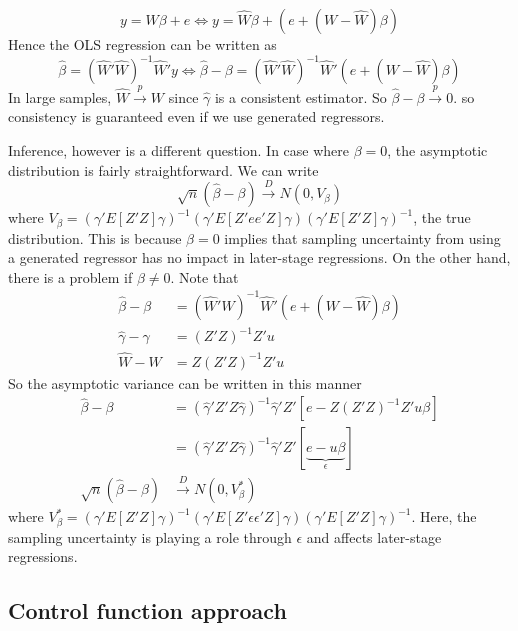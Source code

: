 \documentclass[12pt]{article}
\theoremstyle{definition}
\theoremstyle{property}
\theoremstyle{assumption}
\theoremstyle{example}
\theoremstyle{comment}
\begin{document}
\begin{itemize}
\[y=W\beta+e \iff y=\widehat{W}\beta + (e+(W-\widehat{W})\beta)
\]
Hence the OLS regression can be written as
\[
\hat{\beta} = (\widehat{W}'\widehat{W})^{-1}\widehat{W}'y \iff \hat{\beta}-\beta =  (\widehat{W}'\widehat{W})^{-1}\widehat{W}'(e+(W-\widehat{W})\beta)
\]
In large samples, $\widehat{W}\xrightarrow{p}W$ since $\hat{\gamma}$ is a consistent estimator. So $\hat{\beta}-\beta\xrightarrow{p}0$. so consistency is guaranteed even if we use generated regressors. 
\par
Inference, however is a different question. In case where $\beta=0$, the asymptotic distribution is fairly straightforward. We can write
\[
\sqrt{n}(\hat{\beta}-\beta)\xrightarrow{D}N(0,V_\beta)
\]
where $V_\beta=\left(\gamma'E[Z'Z]\gamma\right)^{-1}\left(\gamma'E[Z'ee'Z] \gamma\right) \left(\gamma'E[Z'Z]\gamma\right)^{-1}$, the true distribution. This is because $\beta=0$ implies that sampling uncertainty from using a generated regressor has no impact in later-stage regressions. On the other hand, there is a problem if $\beta\neq0$. Note that
\[
\begin{aligned}
\hat{\beta}-\beta &= (\widehat{W}'\widehat{W})^{-1}\widehat{W}'(e+(W-\widehat{W})\beta)\\
\hat{\gamma}-\gamma &= (Z'Z)^{-1}Z'u\\
\widehat{W}-W &= Z(Z'Z)^{-1}Z'u
\end{aligned}
\]
So the asymptotic variance can be written in this manner
\[
\begin{aligned}
\hat{\beta}-\beta &= (\hat{\gamma}'Z'Z\hat{\gamma})^{-1}\hat{\gamma}'Z'[e-Z(Z'Z)^{-1}Z'u\beta] \\
&=(\hat{\gamma}'Z'Z\hat{\gamma})^{-1}\hat{\gamma}'Z'[\underbrace{e-u\beta}_{\epsilon}]\\
\sqrt{n}(\hat{\beta}-\beta)&\xrightarrow{D}N(0,V_\beta^*)
\end{aligned}
\]
where $V_\beta^*=\left(\gamma'E[Z'Z]\gamma\right)^{-1}\left(\gamma'E[Z'\epsilon\epsilon'Z] \gamma\right) \left(\gamma'E[Z'Z]\gamma\right)^{-1}$. Here, the sampling uncertainty is playing a role through $\epsilon$ and affects later-stage regressions. 
\end{itemize}


\subsection{Control function approach}
\end{document}
